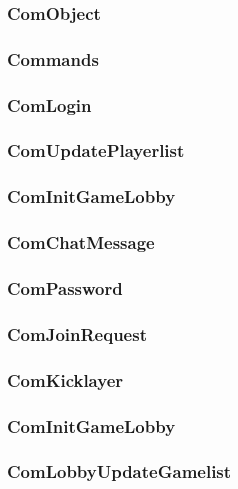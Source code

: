 \documentclass{article}
\begin{document}
\subsubsection{ComObject}
\subsubsection{Commands}
\subsubsection{ComLogin}
\subsubsection{ComUpdatePlayerlist}
\subsubsection{ComInitGameLobby}
\subsubsection{ComChatMessage}
\subsubsection{ComPassword}
\subsubsection{ComJoinRequest}
\subsubsection{ComKicklayer}
\subsubsection{ComInitGameLobby}
\subsubsection{ComLobbyUpdateGamelist}
\newpage
		
\end{document}
